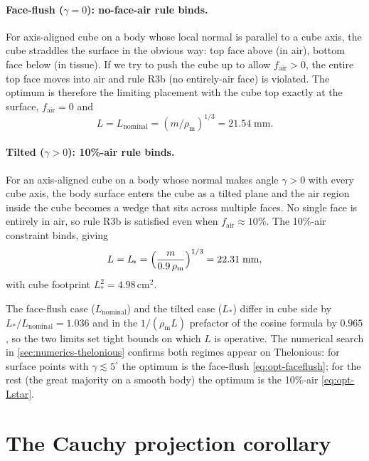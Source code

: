 \documentclass[11pt,a4paper]{article}
\theoremstyle{definition}
\theoremstyle{remark}
\newcommand{\rhom}{\rho_{\mathrm{m}}}
\newcommand{\Lact}{L_{\!*}}
\begin{document}
\paragraph{Face-flush ($\gamma=0$): no-face-air rule binds.}
For axis-aligned cube on a body whose local normal is parallel to a
cube axis, the cube straddles the surface in the obvious way: top face
above (in air), bottom face below (in tissue). If we try to push the
cube up to allow $f_{\mathrm{air}}>0$, the entire top face moves into
air and rule R3b (no entirely-air face) is violated. The optimum is
therefore the limiting placement with the cube top exactly at the
surface, $f_{\mathrm{air}}=0$ and
\begin{equation}\label{eq:opt-faceflush}
  L = L_{\mathrm{nominal}} = (m/\rhom)^{1/3} = 21.54\;\mathrm{mm}.
\end{equation}

\paragraph{Tilted ($\gamma>0$): 10\%-air rule binds.}
For an axis-aligned cube on a body whose normal makes angle
$\gamma>0$ with every cube axis, the body surface enters the cube as a
tilted plane and the air region inside the cube becomes a wedge that
sits across multiple faces. No single face is entirely in air, so
rule R3b is satisfied even when $f_{\mathrm{air}}\approx 10\%$. The
10\%-air constraint binds, giving
\begin{equation}\label{eq:opt-Lstar}
  L = \Lact = \Bigl(\frac{m}{0.9\,\rhom}\Bigr)^{1/3}
  = 22.31\;\mathrm{mm},
\end{equation}
with cube footprint $\Lact^2 = 4.98$\,cm$^2$.

\medskip\noindent
The face-flush case ($L_{\mathrm{nominal}}$) and the tilted case
($\Lact$) differ in cube side by $\Lact/L_{\mathrm{nominal}} = 1.036$
and in the $1/(\rhom L)$ prefactor of the cosine formula by $0.965$,
so the two limits set tight bounds on which $L$ is operative. The
numerical search in \cref{sec:numerics-thelonious} confirms both
regimes appear on Thelonious: for surface points with
$\gamma\lesssim 5^\circ$ the optimum is the face-flush
\cref{eq:opt-faceflush}; for the rest (the great majority on a smooth
body) the optimum is the 10\%-air \cref{eq:opt-Lstar}.


\section{The Cauchy projection corollary}
\label{sec:corollary}
\end{document}

